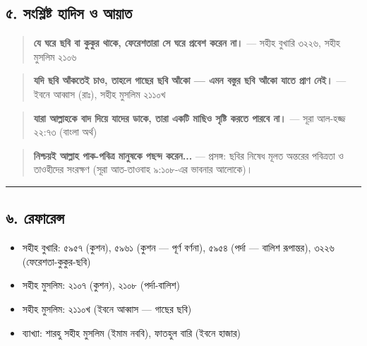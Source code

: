 \subsection*{৫. সংশ্লিষ্ট হাদিস ও আয়াত}

\begin{quote}
\textbf{যে ঘরে ছবি বা কুকুর থাকে, ফেরেশতারা সে ঘরে প্রবেশ করেন না।} — সহীহ বুখারি ৩২২৬, সহীহ মুসলিম ২১০৬
\end{quote}

\begin{quote}
\textbf{যদি ছবি আঁকতেই চাও, তাহলে গাছের ছবি আঁকো — এমন বস্তুর ছবি আঁকো যাতে প্রাণ নেই।} — ইবনে আব্বাস (রাঃ), সহীহ মুসলিম ২১১০খ
\end{quote}

\begin{quote}
\textbf{যারা আল্লাহকে বাদ দিয়ে যাদের ডাকে, তারা একটি মাছিও সৃষ্টি করতে পারবে না।} — সূরা আল-হজ্জ ২২:৭৩ (বাংলা অর্থ)
\end{quote}

\begin{quote}
\textbf{নিশ্চয়ই আল্লাহ পাক-পবিত্র মানুষকে পছন্দ করেন...} — প্রসঙ্গ: ছবির নিষেধ মূলত অন্তরের পবিত্রতা ও তাওহীদের সংরক্ষণ (সূরা আত-তাওবাহ ৯:১০৮-এর ভাবনার আলোকে)।
\end{quote}

\medskip\hrule\medskip

\subsection*{৬. রেফারেন্স}

\begin{itemize}
\item সহীহ বুখারি: ৫৯৫৭ (কুশন), ৫৯৬১ (কুশন — পূর্ণ বর্ণনা), ৫৯৫৪ (পর্দা — বালিশ রূপান্তর), ৩২২৬ (ফেরেশতা-কুকুর-ছবি)
\item সহীহ মুসলিম: ২১০৭ (কুশন), ২১০৮ (পর্দা-বালিশ)
\item সহীহ মুসলিম: ২১১০খ (ইবনে আব্বাস — গাছের ছবি)
\item ব্যাখ্যা: শারহু সহীহ মুসলিম (ইমাম নববি), ফাতহুল বারি (ইবনে হাজার)
\end{itemize}


